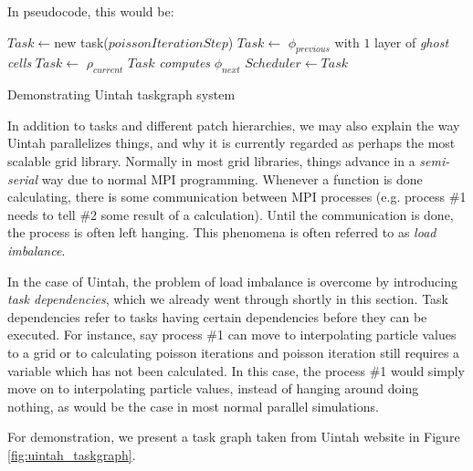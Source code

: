 \documentclass[notitlepage, 12pt]{article}
\begin{document}
In pseudocode, this would be:
\begin{algorithm}[H]
 \begin{algorithmic}
  \State $Task \gets $new task($poissonIterationStep$)
  \State $Task \gets$ $\phi_{previous}$ with $1$ layer of \emph{ghost cells}
  \State $Task \gets$ $\rho_{current}$
  \State $Task$ \emph{computes} $\phi_{next}$
  \State $Scheduler \gets Task$
 \end{algorithmic}
 \caption{Demonstrating Uintah taskgraph system}
 \label{alg:uintah_task}
\end{algorithm}

In addition to tasks and different patch hierarchies, we may also explain the way Uintah parallelizes things, and why it is currently regarded as perhaps 
the most scalable grid library. Normally in most grid libraries, things advance in a \emph{semi-serial} way due to normal MPI programming. Whenever 
a function is done calculating, there is some communication between MPI processes (e.g. process \#1 needs to tell \#2 some result of a calculation). Until the 
communication is done, the process is often left hanging. This phenomena is often referred to as \emph{load imbalance}.

In the case of Uintah, the problem of load imbalance is overcome by introducing \emph{task dependencies}, which we already went through shortly in this section. 
Task dependencies refer to tasks having certain dependencies before they can be executed. For instance, say process \#1 can move to interpolating particle 
values to a grid or to calculating poisson iterations and poisson iteration still requires a variable which has not been calculated. In this case, the 
process \#1 would simply move on to interpolating particle values, instead of hanging around doing nothing, as would be the case in most normal parallel 
simulations.

For demonstration, we present a task graph taken from Uintah website in Figure \ref{fig:uintah_taskgraph}.
\end{document}
